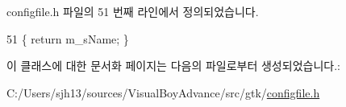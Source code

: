 configfile.\+h 파일의 51 번째 라인에서 정의되었습니다.


\begin{DoxyCode}
51 \{ \textcolor{keywordflow}{return} m\_sName; \}
\end{DoxyCode}


이 클래스에 대한 문서화 페이지는 다음의 파일로부터 생성되었습니다.\+:\begin{DoxyCompactItemize}
\item 
C\+:/\+Users/sjh13/sources/\+Visual\+Boy\+Advance/src/gtk/\mbox{\hyperlink{configfile_8h}{configfile.\+h}}\end{DoxyCompactItemize}
